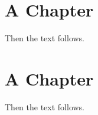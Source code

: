 \documentclass{book}
\begin{document}
    \chapter{A Chapter}

    Then the text follows.
    \chapter{A Chapter}
    Then the text follows.
\end{document}
